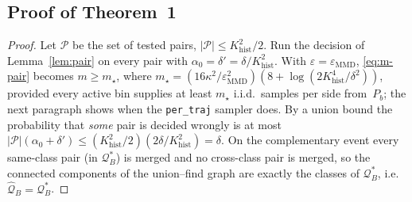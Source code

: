 \documentclass[10pt]{article}
\newcommand{\calQ}{\mathcal{Q}}
\newcommand{\calP}{\mathcal{P}}
\newcommand{\epsMMD}{\varepsilon_{\mathrm{MMD}}}
\newcommand{\Qstar}{\mathcal{Q}^*}
\newcommand{\Khist}{K_{\mathrm{hist}}}
\begin{document}
\subsection{Proof of Theorem~1}

\begin{proof}
Let $\calP$ be the set of tested pairs, $|\calP|\le\Khist^2/2$.  Run the
decision of Lemma~\ref{lem:pair} on every pair with
$\alpha_0=\delta'=\delta/\Khist^2$.  With $\varepsilon=\epsMMD$,
\eqref{eq:m-pair} becomes $m\ge m_\star$, where
$m_\star=(16\kappa^2/\epsMMD^2)(8+\log(2\Khist^4/\delta^2))$, provided every
active bin supplies at least $m_\star$ i.i.d.\ samples per side from~$P_b$;
the next paragraph shows when the \texttt{per\_traj} sampler does.  By a union bound
the probability that \emph{some} pair is decided wrongly is at most
$|\calP|(\alpha_0+\delta')\le(\Khist^2/2)(2\delta/\Khist^2)=\delta$.  On the
complementary event every same-class pair (in $\Qstar_B$) is merged and no
cross-class pair is merged, so the connected components of the union--find
graph are exactly the classes of $\Qstar_B$, i.e.\ $\widehat{\calQ}_B=\Qstar_B$.


\end{proof}
\end{document}
